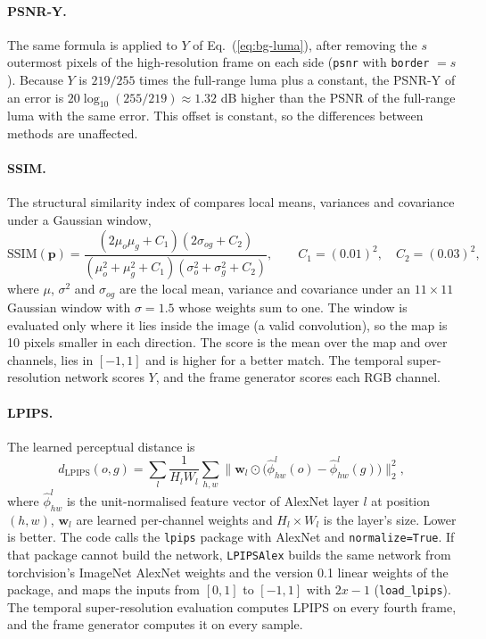 \paragraph{PSNR-Y.} The same formula is applied to $Y$ of Eq.~(\ref{eq:bg-luma}), after removing the $s$ outermost pixels of the high-resolution frame on each side (\texttt{psnr} with \texttt{border} $=s$). Because $Y$ is $219/255$ times the full-range luma plus a constant, the PSNR-Y of an error is $20\log_{10}(255/219)\approx1.32$ dB higher than the PSNR of the full-range luma with the same error. This offset is constant, so the differences between methods are unaffected.

\paragraph{SSIM.} The structural similarity index of \cite{wang2004ssim} compares local means, variances and covariance under a Gaussian window,
\begin{equation}
\mathrm{SSIM}(\mathbf p)=\frac{(2\mu_o\mu_g+C_1)(2\sigma_{og}+C_2)}{(\mu_o^2+\mu_g^2+C_1)(\sigma_o^2+\sigma_g^2+C_2)},\qquad C_1=(0.01)^2,\quad C_2=(0.03)^2,\label{eq:bg-ssim}
\end{equation}
where $\mu$, $\sigma^2$ and $\sigma_{og}$ are the local mean, variance and covariance under an $11\times11$ Gaussian window with $\sigma=1.5$ whose weights sum to one. The window is evaluated only where it lies inside the image (a valid convolution), so the map is 10 pixels smaller in each direction. The score is the mean over the map and over channels, lies in $[-1,1]$ and is higher for a better match. The temporal super-resolution network scores $Y$, and the frame generator scores each RGB channel.

\paragraph{LPIPS.} The learned perceptual distance \cite{zhang2018lpips} is
\begin{equation}
d_{\text{LPIPS}}(o,g)=\sum_{l}\frac{1}{H_lW_l}\sum_{h,w}\big\|\mathbf w_l\odot\big(\hat\phi^l_{hw}(o)-\hat\phi^l_{hw}(g)\big)\big\|_2^2,\label{eq:bg-lpips}
\end{equation}
where $\hat\phi^l_{hw}$ is the unit-normalised feature vector of AlexNet layer $l$ at position $(h,w)$, $\mathbf w_l$ are learned per-channel weights and $H_l\times W_l$ is the layer's size. Lower is better. The code calls the \texttt{lpips} package with AlexNet and \texttt{normalize=True}. If that package cannot build the network, \texttt{LPIPSAlex} builds the same network from torchvision's ImageNet AlexNet weights and the version 0.1 linear weights of the package, and maps the inputs from $[0,1]$ to $[-1,1]$ with $2x-1$ (\texttt{load\_lpips}). The temporal super-resolution evaluation computes LPIPS on every fourth frame, and the frame generator computes it on every sample.

